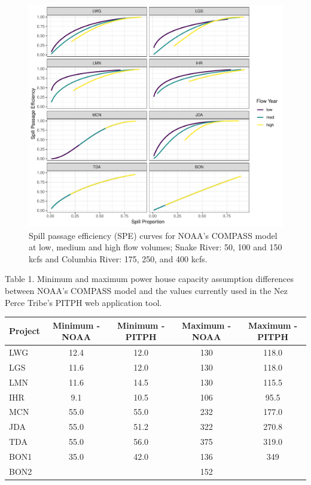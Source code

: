 \documentclass[]{article}
\makeatletter
\def\maxwidth{\ifdim\Gin@nat@width>\linewidth\linewidth
  \else\Gin@nat@width\fi}
\let\Oldincludegraphics\includegraphics
\renewcommand{\includegraphics}[1]{\Oldincludegraphics[width=\maxwidth]{#1}}
\makeatother
\begin{document}
\begin{figure}
\centering
\includegraphics{spe_comparisons_files/figure-latex/unnamed-chunk-5-1.pdf}
\caption{Spill passage efficiency (SPE) curves for NOAA's COMPASS model
at low, medium and high flow volumes; Snake River: 50, 100 and 150 kcfs
and Columbia River: 175, 250, and 400 kcfs.}
\end{figure}

Table 1. Minimum and maximum power house capacity assumption differences
between NOAA's COMPASS model and the values currently used in the Nez
Perce Tribe's PITPH web application tool.

\begin{longtable}[]{@{}lcccc@{}}
\toprule
Project & Minimum - NOAA & Minimum - PITPH & Maximum - NOAA & Maximum -
PITPH\tabularnewline
\midrule
\endhead
LWG & 12.4 & 12.0 & 130 & 118.0\tabularnewline
LGS & 11.6 & 12.0 & 130 & 118.0\tabularnewline
LMN & 11.6 & 14.5 & 130 & 115.5\tabularnewline
IHR & 9.1 & 10.5 & 106 & 95.5\tabularnewline
MCN & 55.0 & 55.0 & 232 & 177.0\tabularnewline
JDA & 55.0 & 51.2 & 322 & 270.8\tabularnewline
TDA & 55.0 & 56.0 & 375 & 319.0\tabularnewline
BON1 & 35.0 & 42.0 & 136 & 349\tabularnewline
BON2 & & & 152 &\tabularnewline
\bottomrule
\end{longtable}
  \newpage
  \singlespacing 
        
\end{document}
